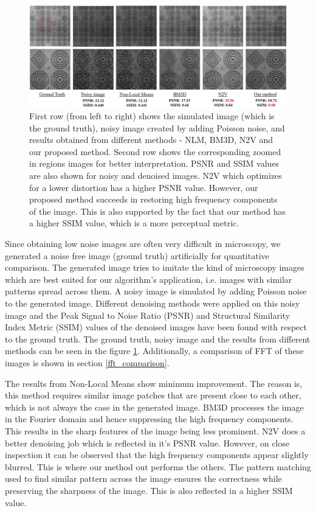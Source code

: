 \documentclass[fleqn,10pt]{wlscirep}
\begin{document}
	\begin{figure}[H]
		\centering
		\includegraphics[scale=0.5]{./imgs/comparison_sample_new_zoomed.jpg}
		\caption{First row (from left to right) shows the simulated image (which is the ground truth), noisy image created by adding Poisson noise, and  results obtained from different methods - NLM, BM3D, N2V and our proposed method. Second row shows the corresponding zoomed in regions images for better interpretation. PSNR and SSIM values are also shown for noisy and denoised images. N2V which optimizes for a lower distortion has a higher PSNR value. However, our proposed method succeeds in restoring high frequency components of the image. This is also supported by the fact that our method has a higher SSIM value, which is a more perceptual metric.}
		\label{fig:comparison_sample}
	\end{figure}


	Since obtaining low noise images are often very difficult in microscopy, we generated a noise free image (ground truth) artificially for quantitative comparison. The generated image tries to imitate the kind of microscopy images which are best suited for our algorithm's application, i.e. images with similar patterns spread across them. A noisy image is simulated by adding Poisson noise to the generated image. Different denoising methods were applied on this noisy image and the Peak Signal to Noise Ratio (PSNR) and Structural Similarity Index Metric (SSIM) values of the denoised images have been found with respect to the ground truth. The ground truth, noisy image and the results from different methods can be seen in the figure \ref{fig:comparison_sample}. Additionally, a comparison of FFT of these images is shown in section \ref{fft_comparison}.
	
	The results from Non-Local Means show minimum improvement. The reason is, this method requires similar image patches that are present close to each other, which is not always the case in the generated image. BM3D processes the image in the Fourier domain and hence suppressing the high frequency components. This results in the sharp features of the image being less prominent. N2V does a better denoising job which is reflected in it's PSNR value. However, on close inspection it can be observed that the high frequency components appear slightly blurred. This is where our method out performs the others. The pattern matching used to find similar pattern across the image ensures the correctness while preserving the sharpness of the image. This is also reflected in a higher SSIM value.
	
\end{document}
